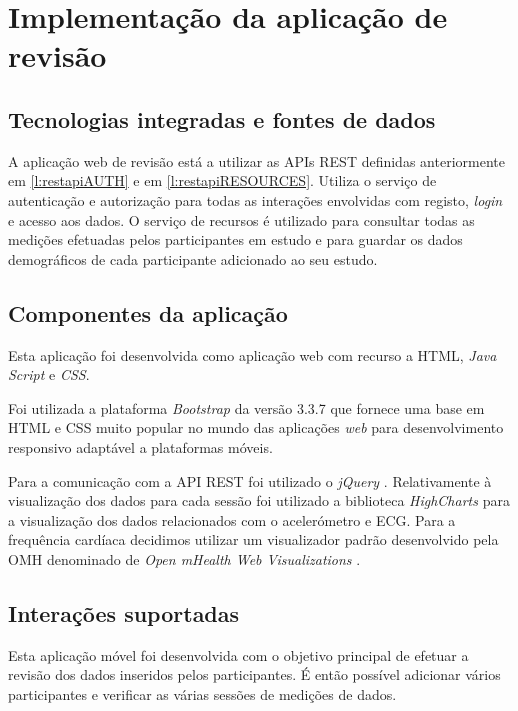 \section{Implementação da aplicação de revisão}
\subsection{Tecnologias integradas e fontes de dados}

A aplicação web de revisão está a utilizar as \gls{API}s \gls{REST} definidas anteriormente em \ref{l:restapiAUTH} e em \ref{l:restapiRESOURCES}. Utiliza o serviço de autenticação e autorização para todas as interações envolvidas com registo, \textit{login} e acesso aos dados. O serviço de recursos é utilizado para consultar todas as medições efetuadas pelos participantes em estudo e para guardar os dados demográficos de cada participante adicionado ao seu estudo.\par

\subsection{Componentes da aplicação}
Esta aplicação foi desenvolvida como aplicação web com recurso a \gls{HTML}, \textit{Java Script} e \textit{\gls{CSS}}. \par 
Foi utilizada a plataforma \textit{Bootstrap} \cite{bootstrap} da versão 3.3.7 que fornece uma base em \gls{HTML} e \gls{CSS} muito popular no mundo das aplicações \textit{web} para desenvolvimento responsivo adaptável a plataformas móveis. \par
Para a comunicação com a \gls{API} \gls{REST} foi utilizado o \textit{jQuery} \cite{jquery}.
Relativamente à visualização dos dados para cada sessão foi utilizado a biblioteca \textit{HighCharts} \cite{highcharts} para a visualização dos dados relacionados com o acelerómetro e \gls{ECG}. Para a frequência cardíaca decidimos utilizar um visualizador padrão desenvolvido pela \gls{OMH} denominado de \textit{Open mHealth Web Visualizations} \cite{omhwebvisualizations}.

\subsection{Interações suportadas }


Esta aplicação móvel foi desenvolvida com o objetivo principal de efetuar a revisão dos dados inseridos pelos participantes. É então possível adicionar vários participantes e verificar as várias sessões de medições de dados.
